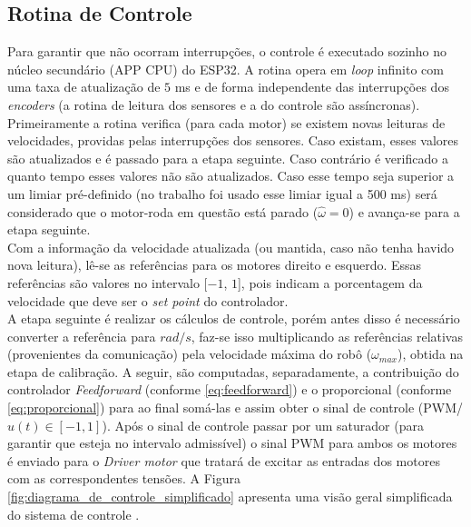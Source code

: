 \subsection{Rotina de Controle}
\label{subsec:rotina_controle}
Para garantir que não ocorram interrupções, o controle é executado sozinho no núcleo secundário (APP CPU) do ESP32. A rotina opera em \emph{loop} infinito com uma taxa de atualização de $5$ ms e de forma independente das interrupções dos \emph{encoders} (a rotina de leitura dos sensores e a do controle são assíncronas).\\

Primeiramente a rotina verifica (para cada motor) se existem novas leituras de velocidades, providas pelas interrupções dos sensores. Caso existam, esses valores são atualizados e é passado para a etapa seguinte. Caso contrário é verificado a quanto tempo esses valores não são atualizados. Caso esse tempo seja superior a um limiar pré-definido (no trabalho foi usado esse limiar igual a 500 ms) será considerado que o motor-roda em questão está parado ($\hat{\omega} = 0$) e avança-se para a etapa seguinte.\\

Com a informação da velocidade atualizada (ou mantida, caso não tenha havido nova leitura), lê-se as referências para os motores direito e esquerdo. Essas referências são valores no intervalo [$-1$, $1$], pois indicam a porcentagem da velocidade que deve ser o \emph{set point} do controlador. \\

A etapa seguinte é realizar os cálculos de controle, porém antes disso é necessário converter a referência para $rad/s$, faz-se isso multiplicando as referências relativas (provenientes da comunicação) pela velocidade máxima do robô ($\omega_{max}$), obtida na etapa de calibração. A seguir, são computadas, separadamente, a contribuição do controlador \emph{Feedforward} (conforme \ref{eq:feedforward}) e o proporcional (conforme \ref{eq:proporcional}) para ao final somá-las e assim obter o sinal de controle (PWM/$u(t) \in [-1,1]$). Após o sinal de controle passar por um saturador (para garantir que esteja no intervalo admissível) o sinal PWM para ambos os motores é enviado para o \emph{Driver motor} que tratará de excitar as entradas dos motores com as correspondentes tensões. A Figura \ref{fig:diagrama_de_controle_simplificado} apresenta uma visão geral simplificada do sistema de controle .

